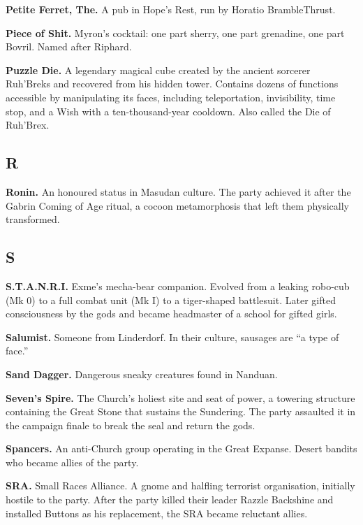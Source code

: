 \smallskip \noindent
\textbf{Petite Ferret, The.} A pub in Hope's Rest, run by Horatio BrambleThrust.

\smallskip \noindent
\textbf{Piece of Shit.} Myron's cocktail: one part sherry, one part grenadine, one part Bovril. Named after Riphard.

\smallskip \noindent
\textbf{Puzzle Die.} A legendary magical cube created by the ancient sorcerer Ruh'Breks and recovered from his hidden tower. Contains dozens of functions accessible by manipulating its faces, including teleportation, invisibility, time stop, and a Wish with a ten-thousand-year cooldown. Also called the Die of Ruh'Brex.

\subsection*{R}

\noindent
\textbf{Ronin.} An honoured status in Masudan culture. The party achieved it after the Gabrin Coming of Age ritual, a cocoon metamorphosis that left them physically transformed.

\subsection*{S}

\noindent
\textbf{S.T.A.N.R.I.} Exme's mecha-bear companion. Evolved from a leaking robo-cub (Mk 0) to a full combat unit (Mk I) to a tiger-shaped battlesuit. Later gifted consciousness by the gods and became headmaster of a school for gifted girls.

\smallskip \noindent
\textbf{Salumist.} Someone from Linderdorf. In their culture, sausages are ``a type of face.''

\smallskip \noindent
\textbf{Sand Dagger.} Dangerous sneaky creatures found in Nanduan.

\smallskip \noindent
\textbf{Seven's Spire.} The Church's holiest site and seat of power, a towering structure containing the Great Stone that sustains the Sundering. The party assaulted it in the campaign finale to break the seal and return the gods.

\smallskip \noindent
\textbf{Spancers.} An anti-Church group operating in the Great Expanse. Desert bandits who became allies of the party.

\smallskip \noindent
\textbf{SRA.} Small Races Alliance. A gnome and halfling terrorist organisation, initially hostile to the party. After the party killed their leader Razzle Backshine and installed Buttons as his replacement, the SRA became reluctant allies.

